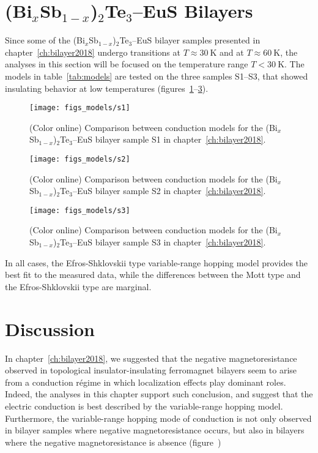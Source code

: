 \section{(Bi$_x$Sb$_{1-x}$)$_2$Te$_3$--EuS Bilayers}
Since some of the (Bi$_x$Sb$_{1-x}$)$_2$Te$_3$--EuS bilayer samples presented in chapter~\ref{ch:bilayer2018} undergo transitions at $T\approx 30~\mathrm{K}$ and at $T \approx 60~\mathrm{K}$, the analyses in this section will be focused on the temperature range $T < 30~\mathrm{K}$. The models in table~\ref{tab:models} are tested on the three samples S1--S3, that showed insulating behavior at low temperatures (figures~\ref{fig:models_s1}--\ref{fig:models_s3}).%
%
\begin{figure}[h!]%
    \centering%
    \texttt{[image: figs\_models/s1]}%
    \caption[Conduction model comparison: (Bi$_x$Sb$_{1-x}$)$_2$Te$_3$--EuS bilayer: S1]{\label{fig:models_s1}(Color online) Comparison between conduction models for the (Bi$_x$Sb$_{1-x}$)$_2$Te$_3$--EuS bilayer sample S1 in chapter~\ref{ch:bilayer2018}.}%
\end{figure}%
%
\begin{figure}[h!]%
    \centering%
    \texttt{[image: figs\_models/s2]}%
    \caption[Conduction model comparison: (Bi$_x$Sb$_{1-x}$)$_2$Te$_3$--EuS bilayer: S2]{\label{fig:models_s2}(Color online) Comparison between conduction models for the (Bi$_x$Sb$_{1-x}$)$_2$Te$_3$--EuS bilayer sample S2 in chapter~\ref{ch:bilayer2018}.}%
\end{figure}%
%
\begin{figure}[h!]%
    \centering%
    \texttt{[image: figs\_models/s3]}%
    \caption[Conduction model comparison: (Bi$_x$Sb$_{1-x}$)$_2$Te$_3$--EuS bilayer: S3]{\label{fig:models_s3}(Color online) Comparison between conduction models for the (Bi$_x$Sb$_{1-x}$)$_2$Te$_3$--EuS bilayer sample S3 in chapter~\ref{ch:bilayer2018}.}%
\end{figure}%

In all cases, the Efros-Shklovskii type variable-range hopping model provides the best fit to the measured data, while the differences between the Mott type and the Efros-Shklovskii type are marginal.

\section{Discussion}
In chapter~\ref{ch:bilayer2018}, we suggested that the negative magnetoresistance observed in topological insulator-insulating ferromagnet bilayers seem to arise from a conduction r\'egime in which localization effects play dominant roles. Indeed, the analyses in this chapter support such conclusion, and suggest that the electric conduction is best described by the variable-range hopping model. Furthermore, the variable-range hopping mode of conduction is not only observed in bilayer samples where negative magnetoresistance occurs, but also in bilayers where the negative magnetoresistance is absence (figure~)